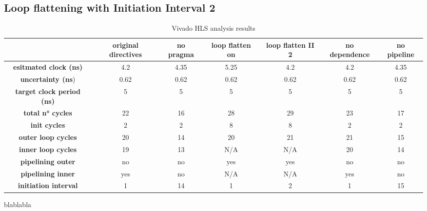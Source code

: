 \documentclass[a4paper]{report}
\begin{document}
\subsection{Loop flattening with Initiation Interval 2}

\begin{landscape}
\begin{table}
\begin{tabular}{|c|c|c|c|c|c|c|}
\hline 
 & \textbf{original directives} & \textbf{no pragma} & \textbf{loop flatten on} & \textbf{loop flatten II 2} & \textbf{no dependence} & \textbf{no pipeline} \\ 
\hline 
\textbf{esitmated clock (ns)} & 4.2 & 4.35 & 5.25 & 4.2 & 4.2 & 4.35 \\ 
\hline 
\textbf{uncertainty (ns}) & 0.62 & 0.62 & 0.62 & 0.62 & 0.62 & 0.62 \\ 
\hline 
\textbf{target clock period (ns)} & 5 & 5 & 5 & 5 & 5 & 5 \\ 
\hline 
\textbf{total n° cycles} & 22 & 16 & 28 & 29 & 23 & 17 \\ 
\hline 
\textbf{init cycles} & 2 & 2 & 8 & 8 & 2 & 2 \\ 
\hline 
\textbf{outer loop cycles} & 20 & 14 & 20 & 21 & 21 & 15 \\ 
\hline 
\textbf{inner loop cycles} & 19 & 13 & N/A & N/A & 20 & 14 \\ 
\hline 
\textbf{pipelining outer} & no & no & yes & yes & no & no \\ 
\hline 
\textbf{pipelining inner} & yes & no & N/A & N/A & yes & no \\ 
\hline 
\textbf{initiation interval} & 1 & 14 & 1 & 2 & 1 & 15 \\ 
\hline 
\end{tabular}
\caption{Vivado HLS analysis results}
\label{table:HLS_analysis}
\end{table}


\end{landscape}

blablabla
\end{document}
